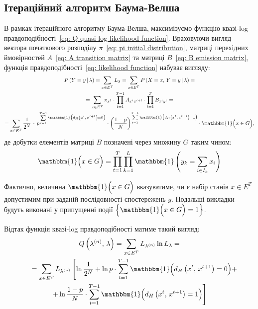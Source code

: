 \subsection{Ітераційний алгоритм Баума-Велша}

В рамках ітераційного алгоритму Баума-Велша, максимізуємо функцію квазі-log правдоподібності~\eqref{eq: Q quasi-log likelihood function}. Враховуючи вигляд вектора початкового розподілу $\pi$~\eqref{eq: pi initial distribution}, матриці перехідних ймовірностей $A$~\eqref{eq: A transition matrix} та матриці $B$~\eqref{eq: B emission matrix}, функція правдоподібності~\eqref{eq: likelihood function} набуває вигляду:
\begin{gather*}
    P\left( Y=y \,|\, \lambda \right) = \sum\limits_{x \in E^T} L_{\lambda} = \sum\limits_{x \in E^T} P\left( X=x,\, Y=y \,|\, \lambda \right) = \\
    = \sum\limits_{x \in E^T} \pi_{x^1} \cdot \prod\limits_{t=1}^{T-1} A_{x^t x^{t+1}} \cdot \prod\limits_{t=1}^{T} B_{x^ty^t} = \\
    = \sum\limits_{x \in E^T} \frac{1}{2^N}\, \cdot\, p^{\sum\limits_{t=1}^{T-1} \mathbbm{1} \bigl( d_H\left( x^t,\,x^{t+1} \right) = 0 \bigr)} \cdot \left(\frac{1-p}{N}\right)^{\sum\limits_{t=1}^{T-1} \mathbbm{1} \bigl( d_H\left( x^t,\,x^{t+1} \right) = 1 \bigr)} \cdot \mathbbm{1} \Bigl( x \in G \Bigr),
\end{gather*}
де добутки елементів матриці $B$ позначені через множину $G$ таким чином: 
\begin{equation*}
    \mathbbm{1} \Bigl( x \in G \Bigr) = \prod\limits_{t=1}^{T} \prod\limits_{k=1}^{L} \mathbbm{1}\left( y_k=\sum\limits_{i \in I_k} x_i \right)
\end{equation*}

Фактично, величина $\mathbbm{1} \Bigl( x \in G \Bigr)$ вказуватиме, чи є набір станів $x \in E^T$ допустимим при заданій послідовності спостережень $y$. Подальші викладки будуть виконані у припущенні події $\left\{ \mathbbm{1} \Bigl( x \in G \Bigr) = 1 \right\}$.

Відтак функція квазі-log правдоподібності матиме такий вигляд:
\begin{multline*}
    Q\left( \lambda^{(n)},\,\lambda \right) = \sum\limits_{x \in E^T}L_{\lambda^{(n)}} \ln L_{\lambda} = \\
    \hspace{5.5mm} = \sum\limits_{x \in E^T}L_{\lambda^{(n)}} \left[ \ln\frac{1}{2^N} + \ln p \cdot \sum\limits_{t=1}^{T-1} \mathbbm{1} \Bigl( d_H\left( x^t,\,x^{t+1} \right) = 0 \Bigr) + \right. \\ 
    \left. + \ln\frac{1-p}{N} \cdot \sum\limits_{t=1}^{T-1} \mathbbm{1} \Bigl( d_H\left( x^t,\,x^{t+1} \right) = 1 \Bigr) \right]
\end{multline*}

